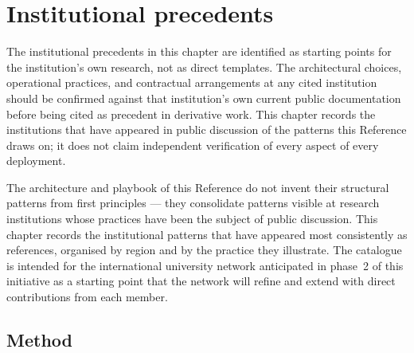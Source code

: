 
\chapter{Institutional precedents}
\label{ch:institutional-precedents}

\begin{caveatbox}
\noindent The institutional precedents in this chapter are
identified as starting points for the institution's own research,
not as direct templates. The architectural choices, operational
practices, and contractual arrangements at any cited institution
should be confirmed against that institution's own current public
documentation before being cited as precedent in derivative work.
This chapter records the institutions that have appeared in
public discussion of the patterns this Reference draws on; it
does not claim independent verification of every aspect of every
deployment.
\end{caveatbox}

The architecture and playbook of this Reference do not invent
their structural patterns from first principles --- they
consolidate patterns visible at research institutions whose practices
have been the subject of public discussion. This chapter records
the institutional patterns that have appeared most consistently as
references, organised by region and by the practice they
illustrate. The catalogue is intended for the international
university network anticipated in phase~2 of this initiative as a
starting point that the network will refine and extend with
direct contributions from each member.

\section{Method}
\label{sec:ip-method}

